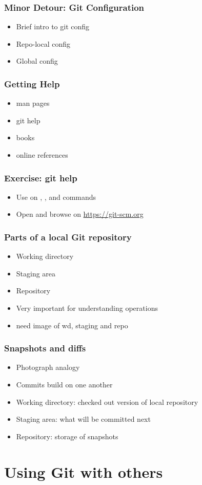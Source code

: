 \documentclass{git_course}
\begin{document}
\begin{frame}
\frametitle{Minor Detour: Git Configuration}
\begin{itemize}
    \item Brief intro to git config
    \item Repo-local config
    \item Global config
\end{itemize}
\end{frame}

\begin{frame}
\frametitle{Getting Help}
\begin{itemize}
    \item man pages
    \item git help
    \item books
    \item online references
\end{itemize}
\end{frame}

\begin{frame}
\frametitle{Exercise: git help}
\begin{itemize}
    \item Use  on , ,  and
         commands
    \item Open and browse on \url{https://git-scm.org}
\end{itemize}
\end{frame}

\begin{frame}
\frametitle{Parts of a local Git repository}
\begin{itemize}
    \item Working directory
    \item Staging area
    \item Repository
    \item Very important for understanding operations
    \item need image of wd, staging and repo
\end{itemize}
\end{frame}

\begin{frame}
\frametitle{Snapshots and diffs}
\begin{itemize}
    \item Photograph analogy
    \item Commits build on one another
    \item Working directory: checked out version of local repository
    \item Staging area: what will be committed next
    \item Repository: storage of snapshots
\end{itemize}
\end{frame}

\section{Using Git with others}
\end{document}
